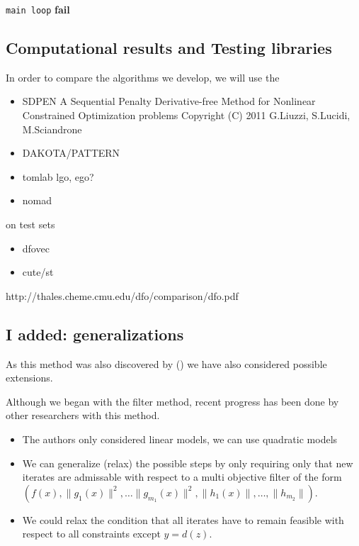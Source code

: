 \documentclass{article}
\begin{document}
\begin{algorithm}
\begin{algorithmic}[1]
			\EndIf
		\Else
			\State \Goto \texttt{main loop}
		\EndIf
	\Else
			\textbf{fail}
		\EndIf
	\EndIf
\EndWhile
\EndProcedure
\end{algorithmic}
\end{algorithm}

\FloatBarrier

\subsection{Computational results and Testing libraries}
In order to compare the algorithms we develop, we will use the



\begin{itemize}
\item SDPEN
A Sequential Penalty Derivative-free Method for Nonlinear
Constrained Optimization problems
Copyright (C) 2011  G.Liuzzi, S.Lucidi, M.Sciandrone
\item DAKOTA/PATTERN
\item tomlab lgo, ego?
\item nomad
\end{itemize}

on test sets

\begin{itemize}
\item dfovec
\item cute/st
\end{itemize}

http://thales.cheme.cmu.edu/dfo/comparison/dfo.pdf


\subsection{I added: generalizations}

As this method was also discovered by () we have also considered possible extensions.

Although we began with the filter method, recent progress has been done by other researchers with this method.



\begin{itemize}
\item The authors only considered linear models, we can use quadratic models
\item We can generalize (relax) the possible steps by only requiring only that new iterates are admissable with respect to a multi objective filter of the form $(f(x), \|g_1(x)\|^2, \ldots \|g_{m_1}(x)\|^2, \|h_1(x)\|, \ldots, \|h_{m_2}\|)$.
\item We could relax the condition that all iterates have to remain feasible with respect to all constraints except $y = d(z)$.
\end{itemize}
\end{document}
